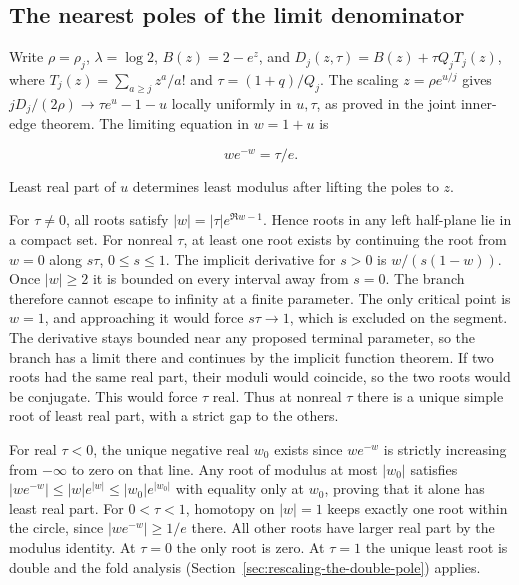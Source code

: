 \documentclass[11pt]{article}
\begin{document}
\subsection{The nearest poles of the limit denominator}
\label{sec:the-nearest-poles-of-the-limit-denominator}

Write \(\rho=\rho_j\), \(\lambda=\log 2\), \(B(z)=2-e^z\), and \(D_j(z,\tau)=B(z)+\tau Q_j T_j(z)\), where \(T_j(z)=\sum_{a\ge j}z^a/a!\) and \(\tau=(1+q)/Q_j\). The scaling \(z=\rho e^{u/j}\) gives \(jD_j/(2\rho)\to \tau e^u-1-u\) locally uniformly in \(u,\tau\), as proved in the joint inner-edge theorem. The limiting equation in \(w=1+u\) is

\begin{equation*}
w e^{-w}=\tau/e.
\end{equation*}

Least real part of \(u\) determines least modulus after lifting the poles to \(z\).

For \(\tau\ne0\), all roots satisfy \(|w|=|\tau|e^{\Re w-1}\). Hence roots in any left half-plane lie in a compact set. For nonreal \(\tau\), at least one root exists by continuing the root from \(w=0\) along \(s\tau\), \(0\le s\le1\). The implicit derivative for \(s>0\) is \(w/(s(1-w))\). Once \(|w|\ge2\) it is bounded on every interval away from \(s=0\). The branch therefore cannot escape to infinity at a finite parameter. The only critical point is \(w=1\), and approaching it would force \(s\tau\to1\), which is excluded on the segment. The derivative stays bounded near any proposed terminal parameter, so the branch has a limit there and continues by the implicit function theorem. If two roots had the same real part, their moduli would coincide, so the two roots would be conjugate. This would force \(\tau\) real. Thus at nonreal \(\tau\) there is a unique simple root of least real part, with a strict gap to the others.

For real \(\tau<0\), the unique negative real \(w_0\) exists since \(we^{-w}\) is strictly increasing from \(-\infty\) to zero on that line. Any root of modulus at most \(|w_0|\) satisfies \(|we^{-w}|\le |w|e^{|w|}\le |w_0|e^{|w_0|}\) with equality only at \(w_0\), proving that it alone has least real part. For \(0<\tau<1\), homotopy on \(|w|=1\) keeps exactly one root within the circle, since \(|we^{-w}|\ge1/e\) there. All other roots have larger real part by the modulus identity. At \(\tau=0\) the only root is zero. At \(\tau=1\) the unique least root is double and the fold analysis (Section~\ref{sec:rescaling-the-double-pole}) applies.
\end{document}
